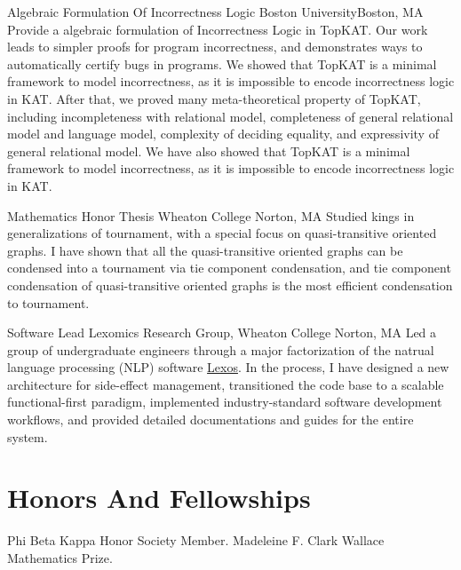\documentclass[11pt,roman]{moderncv}        %
\begin{document}
{Algebraic Formulation Of Incorrectness Logic}
{Boston University}{Boston, MA}{}
{Provide a algebraic formulation of Incorrectness Logic in TopKAT.
Our work leads to simpler proofs for program incorrectness, 
and demonstrates ways to automatically certify bugs in programs.
\iftechnical
We showed that 
TopKAT is a minimal framework to model incorrectness,
as it is impossible to encode incorrectness logic in KAT.
After that, we proved many meta-theoretical property of TopKAT,
including incompleteness with relational model, 
completeness of general relational model and language model, 
complexity of deciding equality, and expressivity of general relational model.
\else 
We have also showed that 
TopKAT is a minimal framework to model incorrectness,
as it is impossible to encode incorrectness logic in KAT.
\fi
}

{Mathematics Honor Thesis}
{Wheaton College} {Norton, MA}{}
{Studied kings in generalizations of tournament,
with a special focus on quasi-transitive oriented graphs.
I have shown that all the quasi-transitive oriented graphs
can be condensed into a tournament via tie component condensation, 
and tie component condensation of quasi-transitive 
oriented graphs is the most efficient condensation to tournament.
}

{Software Lead}
{Lexomics Research Group, Wheaton College}
{Norton, MA}{}
{
  Led a group of undergraduate engineers through a major factorization of 
  the natrual language processing (NLP) software 
  \href{https://github.com/WheatonCS/Lexos}{Lexos}.
  In the process, 
  I have designed a new architecture for side-effect management,
  transitioned the code base to a scalable functional-first paradigm,
  implemented industry-standard software development workflows,
  and provided detailed documentations and guides for the entire system.
}


\section{Honors And Fellowships}
 {Phi Beta Kappa Honor Society Member.}
 {Madeleine F. Clark Wallace Mathematics Prize.}
\end{document}
